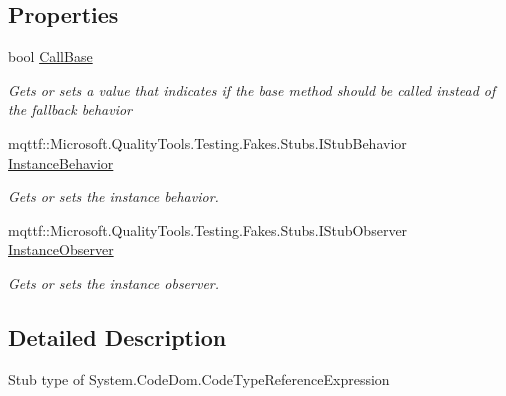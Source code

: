 \subsection*{Properties}
\begin{DoxyCompactItemize}
\item 
bool \hyperlink{class_system_1_1_code_dom_1_1_fakes_1_1_stub_code_type_reference_expression_a7072e92781086a653dcf18173c862e05}{Call\-Base}
\begin{DoxyCompactList}\small\item\em Gets or sets a value that indicates if the base method should be called instead of the fallback behavior\end{DoxyCompactList}\item 
mqttf\-::\-Microsoft.\-Quality\-Tools.\-Testing.\-Fakes.\-Stubs.\-I\-Stub\-Behavior \hyperlink{class_system_1_1_code_dom_1_1_fakes_1_1_stub_code_type_reference_expression_af25b5e7f1039dbc2950087381861e7d4}{Instance\-Behavior}
\begin{DoxyCompactList}\small\item\em Gets or sets the instance behavior.\end{DoxyCompactList}\item 
mqttf\-::\-Microsoft.\-Quality\-Tools.\-Testing.\-Fakes.\-Stubs.\-I\-Stub\-Observer \hyperlink{class_system_1_1_code_dom_1_1_fakes_1_1_stub_code_type_reference_expression_ac84ce4951f75e4a1f60ec55fab15b6dd}{Instance\-Observer}
\begin{DoxyCompactList}\small\item\em Gets or sets the instance observer.\end{DoxyCompactList}\end{DoxyCompactItemize}


\subsection{Detailed Description}
Stub type of System.\-Code\-Dom.\-Code\-Type\-Reference\-Expression



